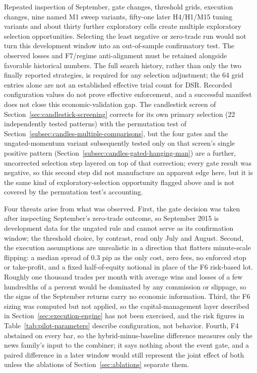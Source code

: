 Repeated inspection of September, gate changes, threshold grids, execution changes, nine named M1 sweep variants, fifty-one later H4/H1/M15 tuning variants and about thirty further exploratory cells create multiple exploratory selection opportunities. Selecting the least negative or zero-trade run would not turn this development window into an out-of-sample confirmatory test. The observed losses and F7/regime anti-alignment must be retained alongside favorable historical numbers. The full search history, rather than only the two finally reported strategies, is required for any selection adjustment; the 64 grid entries alone are not an established effective trial count for DSR. Recorded configuration values do not prove effective enforcement, and a successful manifest does not close this economic-validation gap. The candlestick screen of Section~\ref{sec:candlestick-screening} corrects for its own primary selection (22 independently tested patterns) with the permutation test of Section~\ref{subsec:candles-multiple-comparisons}, but the four gates and the ungated-momentum variant subsequently tested only on that screen's single positive pattern (Section~\ref{subsec:candles-gated-hanging-man}) are a further, uncorrected selection step layered on top of that correction; every gate result was negative, so this second step did not manufacture an apparent edge here, but it is the same kind of exploratory-selection opportunity flagged above and is not covered by the permutation test's accounting.

Four threats arise from what was observed. First, the gate decision was taken after inspecting September's zero-trade outcome, so September 2015 is development data for the ungated rule and cannot serve as its confirmation window; the threshold choice, by contrast, read only July and August. Second, the execution assumptions are unrealistic in a direction that flatters minute-scale flipping: a median spread of 0.3 pip as the only cost, zero fees, no enforced stop or take-profit, and a fixed half-of-equity notional in place of the F6 risk-based lot. Roughly one thousand trades per month with average wins and losses of a few hundredths of a percent would be dominated by any commission or slippage, so the signs of the September returns carry no economic information. Third, the F6 sizing was computed but not applied, so the capital-management layer described in Section~\ref{sec:execution-engine} has not been exercised, and the risk figures in Table~\ref{tab:pilot-parameters} describe configuration, not behavior. Fourth, F4 abstained on every bar, so the hybrid-minus-baseline difference measures only the news family's input to the combiner; it says nothing about the event gate, and a paired difference in a later window would still represent the joint effect of both unless the ablations of Section~\ref{sec:ablations} separate them.

